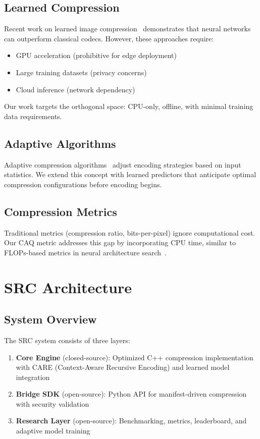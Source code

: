 \documentclass[11pt,twocolumn]{article}
\begin{document}
\subsection{Learned Compression}

Recent work on learned image compression~\cite{balle2018variational,minnen2018joint} demonstrates that neural networks can outperform classical codecs. However, these approaches require:
\begin{itemize}
    \item GPU acceleration (prohibitive for edge deployment)
    \item Large training datasets (privacy concerns)
    \item Cloud inference (network dependency)
\end{itemize}

Our work targets the orthogonal space: CPU-only, offline, with minimal training data requirements.

\subsection{Adaptive Algorithms}

Adaptive compression algorithms~\cite{welch1984technique} adjust encoding strategies based on input statistics. We extend this concept with learned predictors that anticipate optimal compression configurations before encoding begins.

\subsection{Compression Metrics}

Traditional metrics (compression ratio, bits-per-pixel) ignore computational cost. Our CAQ metric addresses this gap by incorporating CPU time, similar to FLOPs-based metrics in neural architecture search~\cite{tan2019efficientnet}.

\section{SRC Architecture}

\subsection{System Overview}

The SRC system consists of three layers:

\begin{enumerate}
    \item \textbf{Core Engine} (closed-source): Optimized C++ compression implementation with CARE (Context-Aware Recursive Encoding) and learned model integration
    \item \textbf{Bridge SDK} (open-source): Python API for manifest-driven compression with security validation
    \item \textbf{Research Layer} (open-source): Benchmarking, metrics, leaderboard, and adaptive model training
\end{enumerate}
\end{document}
